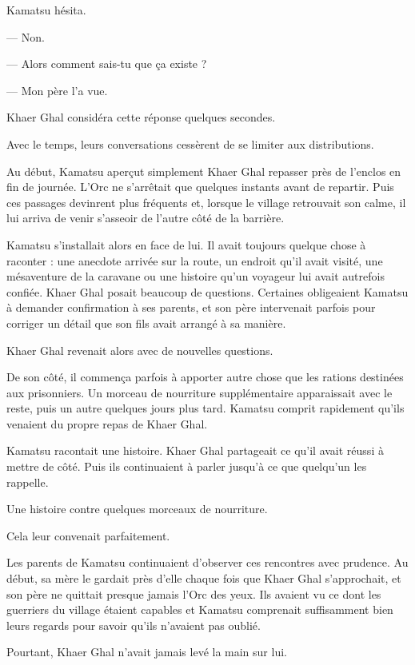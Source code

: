 Kamatsu hésita.

— Non.

— Alors comment sais-tu que ça existe ?

— Mon père l'a vue.

Khaer Ghal considéra cette réponse quelques secondes.

\scenebreak

Avec le temps, leurs conversations cessèrent de se limiter aux distributions.

Au début, Kamatsu aperçut simplement Khaer Ghal repasser près de l'enclos en
fin de journée. L'Orc ne s'arrêtait que quelques instants avant de repartir.
Puis ces passages devinrent plus fréquents et, lorsque le village retrouvait
son calme, il lui arriva de venir s'asseoir de l'autre côté de la barrière.

Kamatsu s'installait alors en face de lui. Il avait toujours quelque chose à
raconter : une anecdote arrivée sur la route, un endroit qu'il avait visité,
une mésaventure de la caravane ou une histoire qu'un voyageur lui avait
autrefois confiée. Khaer Ghal posait beaucoup de questions. Certaines
obligeaient Kamatsu à demander confirmation à ses parents, et son père
intervenait parfois pour corriger un détail que son fils avait arrangé à sa
manière.

Khaer Ghal revenait alors avec de nouvelles questions.

De son côté, il commença parfois à apporter autre chose que les rations
destinées aux prisonniers. Un morceau de nourriture supplémentaire apparaissait
avec le reste, puis un autre quelques jours plus tard. Kamatsu comprit
rapidement qu'ils venaient du propre repas de Khaer Ghal.

Kamatsu racontait une histoire. Khaer Ghal partageait ce qu'il avait réussi à
mettre de côté. Puis ils continuaient à parler jusqu'à ce que quelqu'un les
rappelle.

Une histoire contre quelques morceaux de nourriture.

Cela leur convenait parfaitement.

Les parents de Kamatsu continuaient d'observer ces rencontres avec prudence.
Au début, sa mère le gardait près d'elle chaque fois que Khaer Ghal
s'approchait, et son père ne quittait presque jamais l'Orc des yeux. Ils
avaient vu ce dont les guerriers du village étaient capables et Kamatsu
comprenait suffisamment bien leurs regards pour savoir qu'ils n'avaient pas
oublié.

Pourtant, Khaer Ghal n'avait jamais levé la main sur lui.

